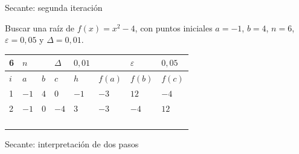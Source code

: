 \documentclass[original_version/main.tex]{subfiles}
\begin{document}
\begin{frame}[t]{Secante: segunda iteración}
\begin{minipage}[t][13mm][t]{\textwidth}\small Buscar una raíz de $f(x)=x^2-4$, con puntos iniciales $a=-1$, $b=4$, $n=6$, $\varepsilon=0{,}05$ y $\Delta=0{,}01$.\end{minipage}\par{\scriptsize\setlength{\tabcolsep}{2pt}\renewcommand{\arraystretch}{1}\begin{center}\begin{tabular}{|C{.04\textwidth}|C{.112\textwidth}|C{.112\textwidth}|C{.112\textwidth}|C{.112\textwidth}|C{.112\textwidth}|C{.112\textwidth}|C{.112\textwidth}|}
\hline
\rule{0pt}{4.3mm}6 & $n$ &  &  $\Delta$  & $0{,}01$ &  & $\varepsilon$ & $0{,}05$\\\hline
\rule{0pt}{4.3mm}$i$ & $a$ & $b$ & $c$ & $h$ & $f(a)$ & $f(b)$ & $f(c)$\\\hline
\rule{0pt}{4.3mm}1 & $-1$ & $4$ & $0$ & $-1$ & $-3$ & $12$ & $-4$\\\hline
\rule{0pt}{4.3mm}2 & $-1$ & $0$ & $-4$ & $3$ & $-3$ & $-4$ & $12$\\\hline
\rule{0pt}{4.3mm} &  &  &  &  &  &  & \\\hline
\rule{0pt}{4.3mm} &  &  &  &  &  &  & \\\hline
\rule{0pt}{4.3mm} &  &  &  &  &  &  & \\\hline
\rule{0pt}{4.3mm} &  &  &  &  &  &  & \\\hline
\end{tabular}\end{center}}\begin{minipage}[t][10mm][t]{\textwidth}\footnotesize \end{minipage}
\end{frame}

\begin{frame}{Secante: interpretación de dos pasos}
\end{frame}
\end{document}
